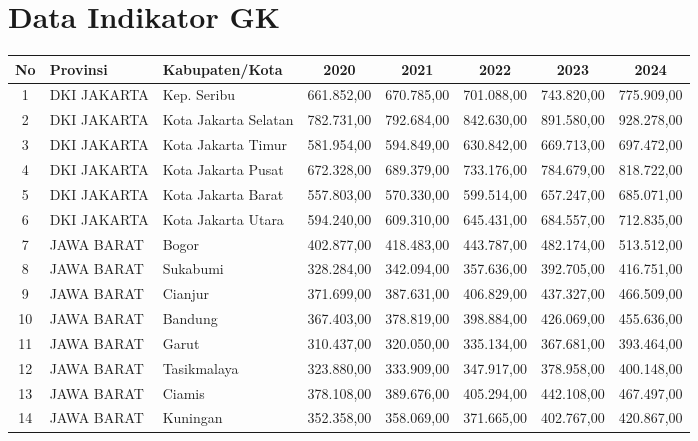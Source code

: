 \section*{Data Indikator GK}
\begin{spacing}{1.0}
\scriptsize
\setlength{\tabcolsep}{2pt}
\begin{longtable}{|c|p{2.2cm}|p{2.8cm}|c|c|c|c|c|}
\hline
\textbf{No} & \textbf{Provinsi} & \textbf{Kabupaten/Kota} & \textbf{2020} & \textbf{2021} & \textbf{2022} & \textbf{2023} & \textbf{2024} \\ \hline
\endhead
1 & DKI JAKARTA & Kep. Seribu & 661.852,00 & 670.785,00 & 701.088,00 & 743.820,00 & 775.909,00 \\ \hline
2 & DKI JAKARTA & Kota Jakarta Selatan & 782.731,00 & 792.684,00 & 842.630,00 & 891.580,00 & 928.278,00 \\ \hline
3 & DKI JAKARTA & Kota Jakarta Timur & 581.954,00 & 594.849,00 & 630.842,00 & 669.713,00 & 697.472,00 \\ \hline
4 & DKI JAKARTA & Kota Jakarta Pusat & 672.328,00 & 689.379,00 & 733.176,00 & 784.679,00 & 818.722,00 \\ \hline
5 & DKI JAKARTA & Kota Jakarta Barat & 557.803,00 & 570.330,00 & 599.514,00 & 657.247,00 & 685.071,00 \\ \hline
6 & DKI JAKARTA & Kota Jakarta Utara & 594.240,00 & 609.310,00 & 645.431,00 & 684.557,00 & 712.835,00 \\ \hline
7 & JAWA BARAT & Bogor & 402.877,00 & 418.483,00 & 443.787,00 & 482.174,00 & 513.512,00 \\ \hline
8 & JAWA BARAT & Sukabumi & 328.284,00 & 342.094,00 & 357.636,00 & 392.705,00 & 416.751,00 \\ \hline
9 & JAWA BARAT & Cianjur & 371.699,00 & 387.631,00 & 406.829,00 & 437.327,00 & 466.509,00 \\ \hline
10 & JAWA BARAT & Bandung & 367.403,00 & 378.819,00 & 398.884,00 & 426.069,00 & 455.636,00 \\ \hline
11 & JAWA BARAT & Garut & 310.437,00 & 320.050,00 & 335.134,00 & 367.681,00 & 393.464,00 \\ \hline
12 & JAWA BARAT & Tasikmalaya & 323.880,00 & 333.909,00 & 347.917,00 & 378.958,00 & 400.148,00 \\ \hline
13 & JAWA BARAT & Ciamis & 378.108,00 & 389.676,00 & 405.294,00 & 442.108,00 & 467.497,00 \\ \hline
14 & JAWA BARAT & Kuningan & 352.358,00 & 358.069,00 & 371.665,00 & 402.767,00 & 420.867,00 \\ \hline

\end{longtable}
\end{spacing}
